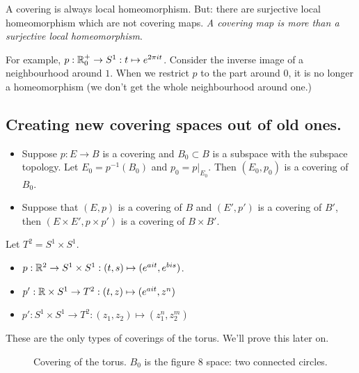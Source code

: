 \begin{remark}
A covering is always local homeomorphism.
But: there are surjective local homeomorphism which are not covering maps.
\emph{A covering map is more than a surjective local homeomorphism}.

For example, $p: \mathbb{R}_0^{+} \to  S^{1}: t \mapsto  e^{2\pi i t}$. Consider the inverse image of a neighbourhood around $1$. When we restrict $p$ to the part around $0$, it is no longer a homeomorphism (we don't get the whole neighbourhood around one.)
\end{remark}

\subsection*{Creating new covering spaces out of old ones.}

\begin{itemize}
    \item Suppose $p: E \to  B$ is a covering and $B_0 \subset B$ is a subspace with the subspace topology.
        Let $E_0 = p^{-1}(B_0)$ and $p_0 = p|_{E_0}$.
        Then $(E_0, p_0)$ is a covering of $B_0$.

    \item Suppose that $(E, p)$ is a covering of $B$ and $(E', p')$ is a covering of $B'$, then $(E\times E', p\times p')$ is a covering of $B \times B'$.
\end{itemize}

\begin{eg}
    Let $T^{2} = S^{1} \times S^{1}$.

    \begin{itemize}
        \item $p: \mathbb{R}^2 \to  S^{1} \times S^{1}: (t, s) \mapsto  (e^{a i t}, e^{b i s})$.
        \item $p': \mathbb{R} \times S^{1} \to  T^{2}: (t, z) \mapsto (e^{a i t}, z^{n})$
        \item $p': S^{1} \times S^{1} \to  T^{2}: (z_1, z_2) \mapsto (z_1^{n}, z_2^{m})$
    \end{itemize}
    These are the only types of coverings of the torus. We'll prove this later on.
\end{eg}

\begin{figure}[H]
    \centering
    \caption{Covering of the torus. $B_0$ is the figure $8$ space: two connected circles.}
    \label{fig:torus-covering}
\end{figure}

